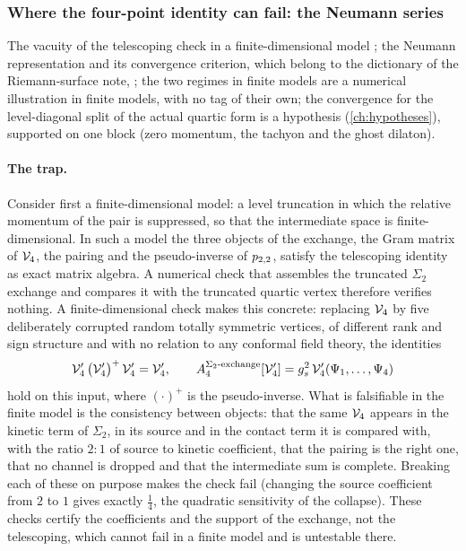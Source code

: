 \subsubsection{Where the four-point identity can fail: the Neumann series}
\label{sec:ws1:neumann}

The vacuity of the telescoping check in a finite-dimensional model ; the Neumann representation and its convergence criterion, which belong to the dictionary of the Riemann-surface note, ; the two regimes in finite models are a numerical illustration in finite models, with no tag of their own; the convergence for the level-diagonal split of the actual quartic form is a hypothesis (\cref{ch:hypotheses}), supported on one block (zero momentum, the tachyon and the ghost dilaton).

\paragraph{The trap.}
Consider first a finite-dimensional model: a level truncation in which the relative momentum of the pair is suppressed, so that the intermediate space is finite-dimensional.
In such a model the three objects of the exchange, the Gram matrix of $\mathcal{V}_{4}$, the pairing and the pseudo-inverse of $p_{2,2}$, satisfy the telescoping identity as exact matrix algebra.
A numerical check that assembles the truncated $\Sigma_2$ exchange and compares it with the truncated quartic vertex therefore verifies nothing.
A finite-dimensional check makes this concrete: replacing $\mathcal{V}_{4}$ by five deliberately corrupted random totally symmetric vertices, of different rank and sign structure and with no relation to any conformal field theory, the identities
\begin{equation}
  \label{eq:ch9:trap}
  \mathcal{V}_{4}' \, \big( \mathcal{V}_{4}' \big)^{+} \, \mathcal{V}_{4}'
    = \mathcal{V}_{4}',
  \qquad
  A_4^{\Sigma_2\text{-exchange}}[\mathcal{V}_{4}']
    = g_s^2 \, \mathcal{V}_{4}'(\Psi_1, \ldots, \Psi_4)
\end{equation}
hold on this input, where $(\cdot)^{+}$ is the pseudo-inverse.
What is falsifiable in the finite model is the consistency between objects: that the same $\mathcal{V}_{4}$ appears in the kinetic term of $\Sigma_2$, in its source and in the contact term it is compared with, with the ratio $2 : 1$ of source to kinetic coefficient, that the pairing is the right one, that no channel is dropped and that the intermediate sum is complete.
Breaking each of these on purpose makes the check fail (changing the source coefficient from $2$ to $1$ gives exactly $\tfrac14$, the quadratic sensitivity of the collapse).
These checks certify the coefficients and the support of the exchange, not the telescoping, which cannot fail in a finite model and is untestable there.

